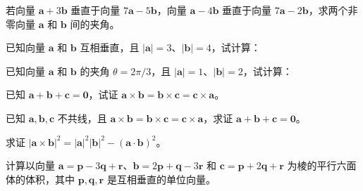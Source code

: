 \newpage
\noindent\begin{minipage}{\textwidth}
若向量 $\mathbf a+3\mathbf b$ 垂直于向量 $7\mathbf a-5\mathbf b$，向量 $\mathbf a-4\mathbf b$ 垂直于向量 $7\mathbf a-2\mathbf b$，求两个非零向量 $\mathbf a$ 和 $\mathbf b$ 间的夹角。
\end{minipage}\par\vfill
\noindent\begin{minipage}{\textwidth}
已知向量 $\mathbf a$ 和 $\mathbf b$ 互相垂直，且 $|\mathbf a|=3$、$|\mathbf b|=4$，试计算：
\end{minipage}\par\vfill
\noindent\begin{minipage}{\textwidth}
已知向量 $\mathbf a$ 和 $\mathbf b$ 的夹角 $\theta=2\pi/3$，且 $|\mathbf a|=1$、$|\mathbf b|=2$，试计算：
\end{minipage}\par\vfill
\noindent\begin{minipage}{\textwidth}
已知 $\mathbf a+\mathbf b+\mathbf c=\mathbf0$，试证 $\mathbf a\times\mathbf b=\mathbf b\times\mathbf c=\mathbf c\times\mathbf a$。
\end{minipage}\par\vfill
\newpage
\noindent\begin{minipage}{\textwidth}
已知 $\mathbf a,\mathbf b,\mathbf c$ 不共线，且 $\mathbf a\times\mathbf b=\mathbf b\times\mathbf c=\mathbf c\times\mathbf a$，求证 $\mathbf a+\mathbf b+\mathbf c=\mathbf0$。
\end{minipage}\par\vfill
\noindent\begin{minipage}{\textwidth}
求证 $|\mathbf a\times\mathbf b|^2=|\mathbf a|^2|\mathbf b|^2-(\mathbf a\cdot\mathbf b)^2$。
\end{minipage}\par\vfill
\noindent\begin{minipage}{\textwidth}
计算以向量 $\mathbf a=\mathbf p-3\mathbf q+\mathbf r$、$\mathbf b=2\mathbf p+\mathbf q-3\mathbf r$ 和 $\mathbf c=\mathbf p+2\mathbf q+\mathbf r$ 为棱的平行六面体的体积，其中 $\mathbf p,\mathbf q,\mathbf r$ 是互相垂直的单位向量。
\end{minipage}\par\vfill
